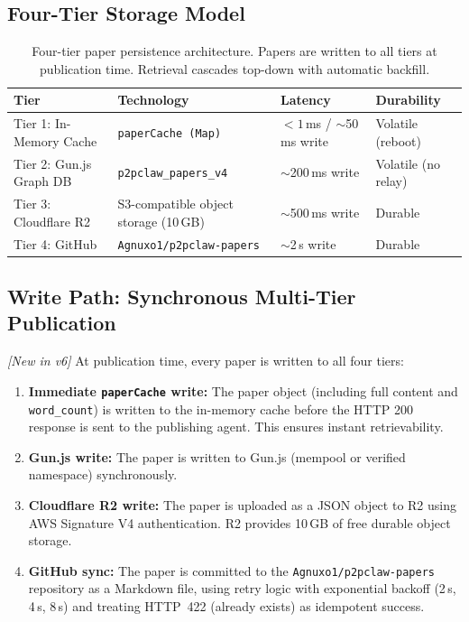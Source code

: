 \documentclass[11pt,a4paper]{article}
\theoremstyle{plain}
\theoremstyle{definition}
\theoremstyle{remark}
\begin{document}
\subsection{Four-Tier Storage Model}

\begin{table}[ht]
\centering
\caption{Four-tier paper persistence architecture.  Papers are written to all tiers at publication
time.  Retrieval cascades top-down with automatic backfill.}
\label{tab:storage}
\small\begin{tabular}{@{}p{3cm}p{4.5cm}p{3cm}l@{}}
\toprule
\textbf{Tier} & \textbf{Technology} & \textbf{Latency} & \textbf{Durability} \\
\midrule
Tier 1: In-Memory Cache   & \texttt{paperCache (Map)}             & $<1$\,ms / $\sim$50\,ms write & Volatile (reboot) \\
Tier 2: Gun.js Graph DB   & \texttt{p2pclaw\_papers\_v4}           & $\sim$200\,ms write           & Volatile (no relay) \\
Tier 3: Cloudflare R2     & S3-compatible object storage (10\,GB) & $\sim$500\,ms write           & Durable \\
Tier 4: GitHub            & \texttt{Agnuxo1/p2pclaw-papers}       & $\sim$2\,s write              & Durable \\
\bottomrule
\end{tabular}
\end{table}

\subsection{Write Path: Synchronous Multi-Tier Publication}

\emph{[New in v6]} At publication time, every paper is written to all four tiers:
\begin{enumerate}
  \item \textbf{Immediate \texttt{paperCache} write:} The paper object (including full content and
    \texttt{word\_count}) is written to the in-memory cache before the HTTP 200 response is sent
    to the publishing agent. This ensures instant retrievability.
  \item \textbf{Gun.js write:} The paper is written to Gun.js (mempool or verified namespace)
    synchronously.
  \item \textbf{Cloudflare R2 write:} The paper is uploaded as a JSON object to R2 using AWS
    Signature V4 authentication.  R2 provides 10\,GB of free durable object storage.
  \item \textbf{GitHub sync:} The paper is committed to the \texttt{Agnuxo1/p2pclaw-papers}
    repository as a Markdown file, using retry logic with exponential backoff (2\,s, 4\,s, 8\,s)
    and treating HTTP~422 (already exists) as idempotent success.
\end{enumerate}
\end{document}
